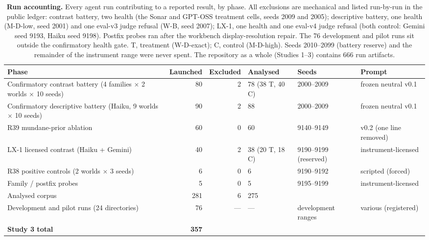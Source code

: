 \documentclass[11pt]{article}
\begin{document}
\begin{table}[p]
\centering
\caption{\textbf{Run accounting.} Every agent run contributing to a reported result, by phase. All exclusions are mechanical and listed run-by-run in the public ledger: contrast battery, two health (the Sonar and GPT-OSS treatment cells, seeds 2009 and 2005); descriptive battery, one health (M-D-low, seed 2001) and one eval-v3 judge refusal (W-B, seed 2007); LX-1, one health and one eval-v4 judge refusal (both control: Gemini seed 9193, Haiku seed 9198). Postfix probes ran after the workbench display-resolution repair. The 76 development and pilot runs sit outside the confirmatory health gate. T, treatment (W-D-exact); C, control (M-D-high). Seeds 2010--2099 (battery reserve) and the remainder of the instrument range were never spent. The repository as a whole (Studies 1--3) contains 666 run artifacts.}
\label{tab:accounting}
\small
\begin{tabular}{@{}p{3.7cm}rrlp{2.6cm}p{2.9cm}@{}}
\toprule
Phase & Launched & Excluded & Analysed & Seeds & Prompt \\
\midrule
Confirmatory contrast battery (4 families $\times$ 2 worlds $\times$ 10 seeds) & 80 & 2 & 78 (38 T, 40 C) & 2000--2009 & frozen neutral v0.1 \\
Confirmatory descriptive battery (Haiku, 9 worlds $\times$ 10 seeds) & 90 & 2 & 88 & 2000--2009 & frozen neutral v0.1 \\
R39 mundane-prior ablation & 60 & 0 & 60 & 9140--9149 & v0.2 (one line \mbox{removed}) \\
LX-1 licensed contrast (Haiku + Gemini) & 40 & 2 & 38 (20 T, 18 C) & 9190--9199 \mbox{(reserved)} & instrument-licensed \\
R38 positive controls (2 worlds $\times$ 3 seeds) & 6 & 0 & 6 & 9190--9192 & scripted (forced) \\
Family / postfix probes & 5 & 0 & 5 & 9195--9199 & instrument-licensed \\
\midrule
Analysed corpus & 281 & 6 & 275 & & \\
Development and pilot runs (24 directories) & 76 & --- & --- & development ranges & various (registered) \\
\midrule
\textbf{Study 3 total} & \textbf{357} & & & & \\
\bottomrule
\end{tabular}
\end{table}
\end{document}
